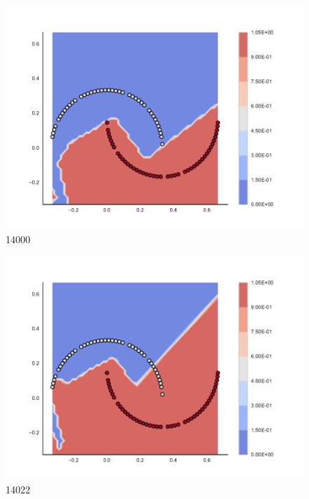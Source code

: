 \begin{subfigure}[b]{0.12\textwidth}
    \includegraphics[clip, trim=2.35cm 1.75cm 4.5cm 0cm,width=\textwidth]{img/convergence/14000.pdf}
    \caption{14000}
    \label{fig:convergence_14000}
\end{subfigure}
%
\begin{subfigure}[b]{0.12\textwidth}
    \includegraphics[clip, trim=2.35cm 1.75cm 4.5cm 0cm,width=\textwidth]{img/convergence/14022.pdf}
    \caption{14022}
    \label{fig:convergence_14022}
\end{subfigure}
%
